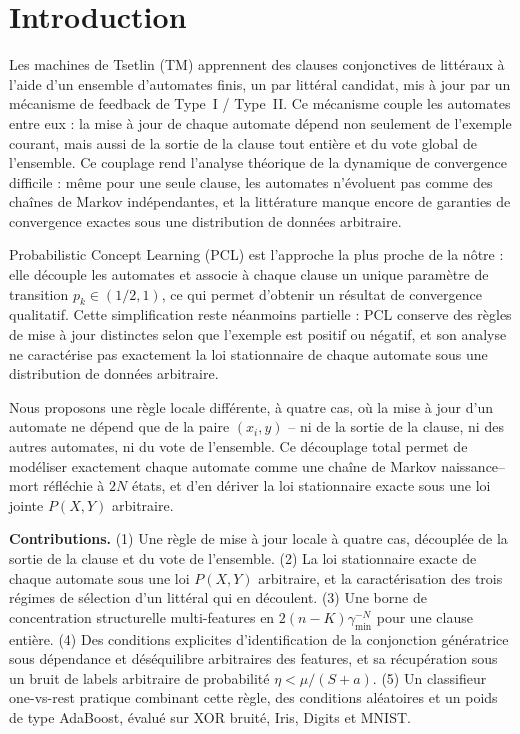 \documentclass[12pt,a4paper]{article}
\begin{document}
\section{Introduction}

Les machines de Tsetlin (TM) apprennent des clauses conjonctives de
littéraux à l'aide d'un ensemble d'automates finis, un par littéral
candidat, mis à jour par un mécanisme de feedback de Type~I / Type~II.
Ce mécanisme couple les automates entre eux : la mise à jour de chaque
automate dépend non seulement de l'exemple courant, mais aussi de la
sortie de la clause tout entière et du vote global de l'ensemble. Ce
couplage rend l'analyse théorique de la dynamique de convergence
difficile : même pour une seule clause, les automates n'évoluent pas comme
des chaînes de Markov indépendantes, et la littérature manque encore de
garanties de convergence exactes sous une distribution de données
arbitraire.

Probabilistic Concept Learning (PCL) est l'approche la plus proche de la
nôtre : elle découple les automates et associe à chaque clause un unique
paramètre de transition $p_k\in(1/2,1)$, ce qui permet d'obtenir un résultat
de convergence qualitatif. Cette simplification reste néanmoins partielle :
PCL conserve des règles de mise à jour distinctes selon que l'exemple est
positif ou négatif, et son analyse ne caractérise pas exactement la loi
stationnaire de chaque automate sous une distribution de données
arbitraire.

Nous proposons une règle locale différente, à quatre cas, où la mise à
jour d'un automate ne dépend que de la paire $(x_i,y)$ -- ni de la sortie
de la clause, ni des autres automates, ni du vote de l'ensemble. Ce
découplage total permet de modéliser exactement chaque automate comme une
chaîne de Markov naissance--mort réfléchie à $2N$ états, et d'en dériver
la loi stationnaire exacte sous une loi jointe $P(X,Y)$ arbitraire.

\textbf{Contributions.} (1) Une règle de mise à jour locale à quatre cas,
découplée de la sortie de la clause et du vote de l'ensemble. (2) La loi
stationnaire exacte de chaque automate sous une loi $P(X,Y)$ arbitraire, et
la caractérisation des trois régimes de sélection d'un littéral qui en
découlent. (3) Une borne de concentration structurelle multi-features en
$2(n-K)\gamma_{\min}^{-N}$ pour une clause entière. (4) Des conditions
explicites d'identification de la conjonction génératrice sous dépendance
et déséquilibre arbitraires des features, et sa récupération sous un bruit
de labels arbitraire de probabilité $\eta<\mu/(S+a)$. (5) Un classifieur
one-vs-rest pratique combinant cette règle, des conditions aléatoires et un
poids de type AdaBoost, évalué sur XOR bruité, Iris, Digits et MNIST.
\end{document}
